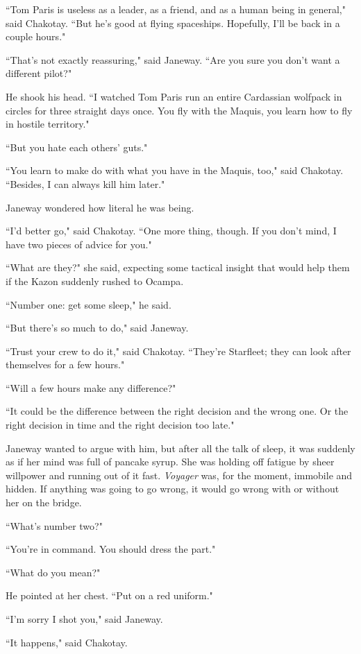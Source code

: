 \documentclass[twoside,letterpaper,12pt]{memoir}
\begin{document}
``Tom Paris is useless as a leader, as a friend, and as a human being in general," said Chakotay. ``But he's good at flying spaceships. Hopefully, I'll be back in a couple hours."

``That's not exactly reassuring," said Janeway. ``Are you sure you don't want a different pilot?"

He shook his head. ``I watched Tom Paris run an entire Cardassian wolfpack in circles for three straight days once. You fly with the Maquis, you learn how to fly in hostile territory."

``But you hate each others' guts."

``You learn to make do with what you have in the Maquis, too," said Chakotay. ``Besides, I can always kill him later."

Janeway wondered how literal he was being.

``I'd better go," said Chakotay. ``One more thing, though. If you don't mind, I have two pieces of advice for you."

``What are they?" she said, expecting some tactical insight that would help them if the Kazon suddenly rushed to Ocampa.

``Number one: get some sleep," he said.

``But there's so much to do," said Janeway.

``Trust your crew to do it," said Chakotay. ``They're Starfleet; they can look after themselves for a few hours."

``Will a few hours make any difference?"

``It could be the difference between the right decision and the wrong one. Or the right decision in time and the right decision too late."

Janeway wanted to argue with him, but after all the talk of sleep, it was suddenly as if her mind was full of pancake syrup. She was holding off fatigue by sheer willpower and running out of it fast. \textit{Voyager} was, for the moment, immobile and hidden. If anything was going to go wrong, it would go wrong with or without her on the bridge.

``What's number two?"

``You're in command. You should dress the part."

``What do you mean?"

He pointed at her chest. ``Put on a red uniform."

``I'm sorry I shot you," said Janeway.

``It happens," said Chakotay.
\end{document}
